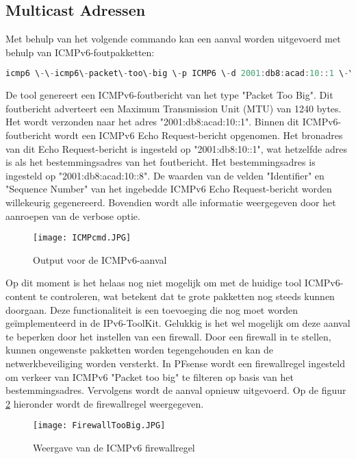 \subsection{Multicast Adressen}
Met behulp van het volgende commando kan een aanval worden uitgevoerd met behulp van ICMPv6-foutpakketten:
\begin{lstlisting}[language=PowerShell,style=PowerShellStyle]
    icmp6 \-\-icmp6\-packet\-too\-big \-p ICMP6 \-d 2001:db8:acad:10::1 \-\-peer\-addr 2001:db8:acad:10::8 \-m 1240 \-v 
\end{lstlisting}

De tool genereert een ICMPv6-foutbericht van het type "Packet Too Big". Dit foutbericht adverteert een Maximum Transmission Unit (MTU) van 1240 bytes. Het wordt verzonden naar het adres "2001:db8:acad:10::1". Binnen dit ICMPv6-foutbericht wordt een ICMPv6 Echo Request-bericht opgenomen. Het bronadres van dit Echo Request-bericht is ingesteld op "2001:db8:10::1", wat hetzelfde adres is als het bestemmingsadres van het foutbericht. Het bestemmingsadres is ingesteld op \newline "2001:db8:acad:10::8". De waarden van de velden "Identifier" en "Sequence Number" van het ingebedde ICMPv6 Echo Request-bericht worden willekeurig gegenereerd. Bovendien wordt alle informatie weergegeven door het aanroepen van de verbose optie.

\begin{figure}[H]
    \texttt{[image: ICMPcmd.JPG]}
    \caption{
        Output voor de ICMPv6-aanval }
        \label{fig:ICMPcmd}
\end{figure}  

Op dit moment is het helaas nog niet mogelijk om met de huidige tool ICMPv6-content te controleren, wat betekent dat te grote pakketten nog steeds kunnen doorgaan. Deze functionaliteit is een toevoeging die nog moet worden geïmplementeerd in de IPv6-ToolKit. Gelukkig is het wel mogelijk om deze aanval te beperken door het instellen van een firewall. Door een firewall in te stellen, kunnen ongewenste pakketten worden tegengehouden en kan de netwerkbeveiliging worden versterkt.
In PFsense wordt een firewallregel ingesteld om verkeer van ICMPv6 "Packet too big" te filteren op basis van het bestemmingsadres. Vervolgens wordt de aanval opnieuw uitgevoerd. Op de figuur \ref{fig:ICMPv6} hieronder wordt de firewallregel weergegeven.

\begin{figure}[H]
    \texttt{[image: FirewallTooBig.JPG]}
    \caption{
        Weergave van de ICMPv6 firewallregel }
        \label{fig:ICMPv6}
\end{figure}  


